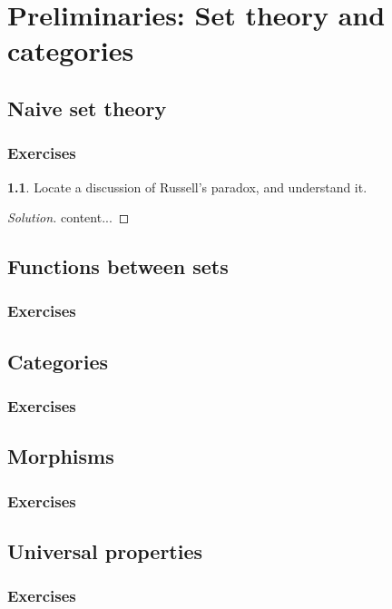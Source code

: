 \documentclass{book}
\newcommand{\extitle}{\subsection*{Exercises}}
\theoremstyle{definition}
\newtheorem{exercise}{}[chapter]
\newenvironment{solution}
{\begin{proof}[Solution]}
	{\end{proof}}
\begin{document}
	\chapter{Preliminaries: Set theory and categories}
	\section{Naive set theory}
	\extitle
	\begin{exercise}
		Locate a discussion of Russell's paradox, and understand it.
	\end{exercise}
	\begin{solution}
		content...
	\end{solution}
	\section{Functions between sets}
	\extitle
	\section{Categories}
	\extitle
	\section{Morphisms}
	\extitle
	\section{Universal properties}
	\extitle
	
\end{document}
